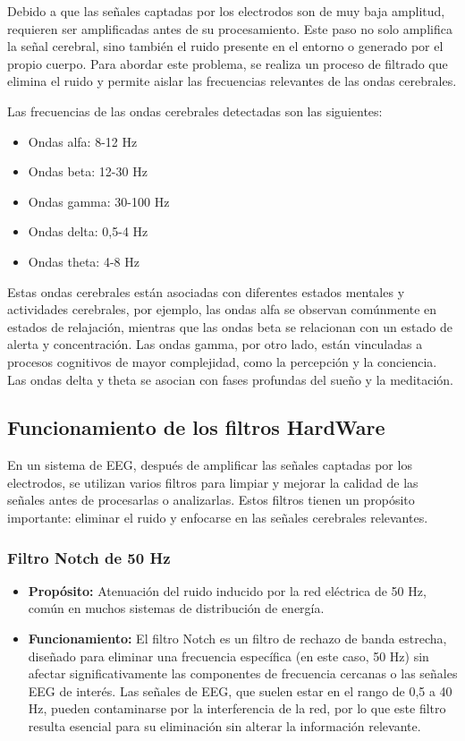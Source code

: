 \documentclass{article}
\begin{document}
Debido a que las señales captadas por los electrodos son de muy baja amplitud, requieren ser amplificadas antes de su procesamiento. Este paso no solo amplifica la señal cerebral, sino también el ruido presente en el entorno o generado por el propio cuerpo. Para abordar este problema, se realiza un proceso de filtrado que elimina el ruido y permite aislar las frecuencias relevantes de las ondas cerebrales.

Las frecuencias de las ondas cerebrales detectadas son las siguientes:

\begin{itemize}
    \item Ondas alfa: 8-12 Hz
    \item Ondas beta: 12-30 Hz
    \item Ondas gamma: 30-100 Hz
    \item Ondas delta: 0,5-4 Hz
    \item Ondas theta: 4-8 Hz
\end{itemize}

Estas ondas cerebrales están asociadas con diferentes estados mentales y actividades cerebrales, por ejemplo, las ondas alfa se observan comúnmente en estados de relajación, mientras que las ondas beta se relacionan con un estado de alerta y concentración. Las ondas gamma, por otro lado, están vinculadas a procesos cognitivos de mayor complejidad, como la percepción y la conciencia. Las ondas delta y theta se asocian con fases profundas del sueño y la meditación.

\subsection{Funcionamiento de los filtros HardWare}

En un sistema de EEG, después de amplificar las señales captadas por los electrodos, se utilizan varios filtros para limpiar y mejorar la calidad de las señales antes de procesarlas o analizarlas. Estos filtros tienen un propósito importante: eliminar el ruido y enfocarse en las señales cerebrales relevantes. 

\subsubsection{Filtro Notch de 50 Hz}
\begin{itemize}
    \item \textbf{Propósito:} Atenuación del ruido inducido por la red eléctrica de 50 Hz, común en muchos sistemas de distribución de energía.
    \item \textbf{Funcionamiento:} El filtro Notch es un filtro de rechazo de banda estrecha, diseñado para eliminar una frecuencia específica (en este caso, 50 Hz) sin afectar significativamente las componentes de frecuencia cercanas o las señales EEG de interés. Las señales de EEG, que suelen estar en el rango de 0,5 a 40 Hz, pueden contaminarse por la interferencia de la red, por lo que este filtro resulta esencial para su eliminación sin alterar la información relevante.
\end{itemize}
\end{document}
